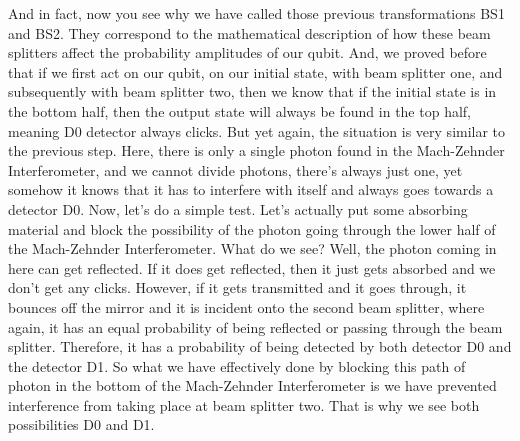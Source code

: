 And in fact, now you see why we have called those previous transformations BS1 and BS2. They correspond to the mathematical description of how these beam splitters affect the probability amplitudes of our qubit. And, we proved before that if we first act on our qubit, on our initial state, with beam splitter one, and subsequently with beam splitter two, then we know that if the initial state is in the bottom half, then the output state will always be found in the top half, meaning D0 detector always clicks. But yet again, the situation is very similar to the previous step. Here, there is only a single photon found in the Mach-Zehnder Interferometer, and we cannot divide photons, there's always just one, yet somehow it knows that it has to interfere with itself and always goes towards a detector D0. Now, let's do a simple test. Let's actually put some absorbing material and block the possibility of the photon going through the lower half of the Mach-Zehnder Interferometer. What do we see? Well, the photon coming in here can get reflected. If it does get reflected, then it just gets absorbed and we don't get any clicks. However, if it gets transmitted and it goes through, it bounces off the mirror and it is incident onto the second beam splitter, where again, it has an equal probability of being reflected or passing through the beam splitter. Therefore, it has a probability of being detected by both detector D0 and the detector D1. So what we have effectively done by blocking this path of photon in the bottom of the Mach-Zehnder Interferometer is we have prevented interference from taking place at beam splitter two. That is why we see both possibilities D0 and D1.


\newpage
\begin{exercises}



\end{exercises}

